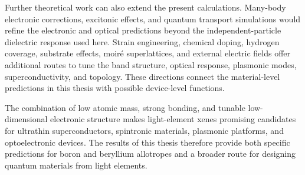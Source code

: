 Further theoretical work can also extend the present calculations.
Many-body electronic corrections, excitonic effects, and quantum transport simulations would refine the electronic and optical predictions beyond the independent-particle dielectric response used here.
Strain engineering, chemical doping, hydrogen coverage, substrate effects, moiré superlattices, and external electric fields offer additional routes to tune the band structure, optical response, plasmonic modes, superconductivity, and topology.
These directions connect the material-level predictions in this thesis with possible device-level functions.

The combination of low atomic mass, strong bonding, and tunable low-dimensional electronic structure makes light-element xenes promising candidates for ultrathin superconductors, spintronic materials, plasmonic platforms, and optoelectronic devices.
The results of this thesis therefore provide both specific predictions for boron and beryllium allotropes and a broader route for designing quantum materials from light elements.
